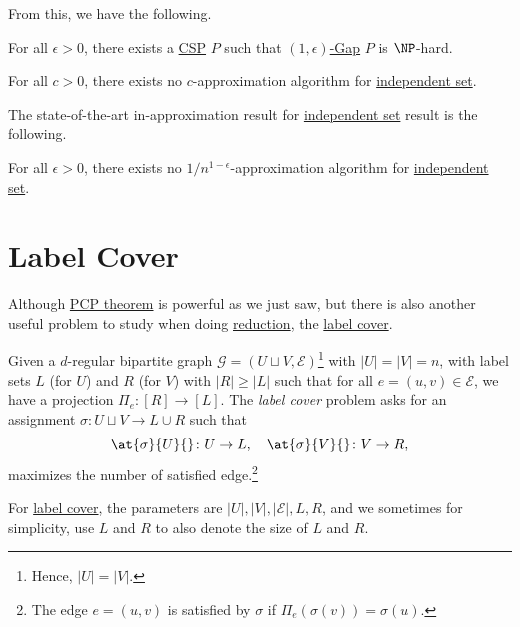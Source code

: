 From this, we have the following.

\begin{theorem}
	For all \(\epsilon > 0\), there exists a \hyperref[prb:CSP]{CSP} \(P\) such that \hyperref[def:c-s-Gap]{\((1, \epsilon )\)-Gap} \(P\) is \(\NP\)-hard.
\end{theorem}
\begin{corollary}
	For all \(c > 0\), there exists no \(c\)-approximation algorithm for \hyperref[prb:independent-set]{independent set}.
\end{corollary}

The state-of-the-art in-approximation result for \hyperref[prb:independent-set]{independent set} result is the following.

\begin{theorem}
	For all \(\epsilon > 0\), there exists no \(1 / n^{1-\epsilon }\)-approximation algorithm for \hyperref[prb:independent-set]{independent set}.
\end{theorem}

\section{Label Cover}
Although \hyperref[thm:PCP]{PCP theorem} is powerful as we just saw, but there is also another useful problem to study when doing \hyperref[def:reduction]{reduction}, the \hyperref[prb:label-cover]{label cover}.

\begin{problem}\label{prb:label-cover}
Given a \(d\)-regular bipartite graph \(\mathcal{G} =(U\sqcup V , \mathcal{E} )\)\footnote{Hence, \(\vert U \vert = \vert V \vert\).} with \(\vert U \vert = \vert V \vert = n\), with label sets \(L\) (for \(U\)) and \(R\) (for \(V \)) with \(\vert R \vert \geq \vert L \vert \) such that for all \(e=(u, v)\in \mathcal{E} \), we have a projection \(\Pi _e \colon [R]\to [L]\). The \emph{label cover} problem asks for an assignment \(\sigma\colon U \sqcup V \to L \cup R\) such that
\[
	\at{\sigma }{U}{} \colon U \to L,\quad \at{\sigma }{V}{} \colon V \to R,
\]
maximizes the number of satisfied edge.\footnote{The edge \(e=(u, v)\) is satisfied by \(\sigma \) if \(\Pi _e(\sigma (v)) = \sigma (u)\).}
\end{problem}

\begin{center}
\end{center}

For \hyperref[prb:label-cover]{label cover}, the parameters are \(\vert U \vert, \vert V \vert , \vert \mathcal{E}  \vert , L, R\), and we sometimes for simplicity, use \(L\) and \(R\) to also denote the size of \(L\) and \(R\).

